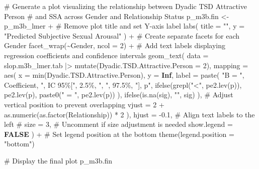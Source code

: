 \documentclass[
  bookmarksnumbered]{article}
\newenvironment{Shaded}{\begin{snugshade}}{\end{snugshade}}
\newcommand{\AttributeTok}[1]{\textcolor[rgb]{0.80,0.80,0.80}{#1}}
\newcommand{\CommentTok}[1]{\textcolor[rgb]{0.50,0.62,0.50}{#1}}
\newcommand{\ConstantTok}[1]{\textcolor[rgb]{0.86,0.64,0.64}{\textbf{#1}}}
\newcommand{\DecValTok}[1]{\textcolor[rgb]{0.86,0.86,0.80}{#1}}
\newcommand{\FloatTok}[1]{\textcolor[rgb]{0.75,0.75,0.82}{#1}}
\newcommand{\FunctionTok}[1]{\textcolor[rgb]{0.94,0.94,0.56}{#1}}
\newcommand{\NormalTok}[1]{\textcolor[rgb]{0.80,0.80,0.80}{#1}}
\newcommand{\OtherTok}[1]{\textcolor[rgb]{0.94,0.94,0.56}{#1}}
\newcommand{\SpecialCharTok}[1]{\textcolor[rgb]{0.86,0.64,0.64}{#1}}
\newcommand{\StringTok}[1]{\textcolor[rgb]{0.80,0.58,0.58}{#1}}
\begin{document}
\begin{Shaded}
\begin{Highlighting}[]
\CommentTok{\# Generate a plot visualizing the relationship between Dyadic TSD Attractive Person}
\CommentTok{\# and SSA across Gender and Relationship Status}
\NormalTok{p\_m3b.fin }\OtherTok{\textless{}{-}}\NormalTok{ p\_m3b\_lmer }\SpecialCharTok{+}
  \CommentTok{\# Remove plot title and set Y{-}axis label}
  \FunctionTok{labs}\NormalTok{(}
    \AttributeTok{title =} \StringTok{""}\NormalTok{,}
    \AttributeTok{y =} \StringTok{"Predicted Subjective Sexual Arousal"}
\NormalTok{  ) }\SpecialCharTok{+}
  \CommentTok{\# Create separate facets for each Gender}
  \FunctionTok{facet\_wrap}\NormalTok{(}\SpecialCharTok{\textasciitilde{}}\NormalTok{Gender, }\AttributeTok{ncol =} \DecValTok{2}\NormalTok{) }\SpecialCharTok{+}
  \CommentTok{\# Add text labels displaying regression coefficients and confidence intervals}
  \FunctionTok{geom\_text}\NormalTok{(}
    \AttributeTok{data =}\NormalTok{ slop.m3b\_lmer.tab }\SpecialCharTok{|\textgreater{}}
      \FunctionTok{mutate}\NormalTok{(}\AttributeTok{Dyadic.TSD.Attractive.Person =} \DecValTok{2}\NormalTok{),}
    \AttributeTok{mapping =} \FunctionTok{aes}\NormalTok{(}
      \AttributeTok{x =} \FunctionTok{min}\NormalTok{(Dyadic.TSD.Attractive.Person), }\AttributeTok{y =} \ConstantTok{Inf}\NormalTok{,}
      \AttributeTok{label =} \FunctionTok{paste}\NormalTok{(}
        \StringTok{"B = "}\NormalTok{, Coefficient,}
        \StringTok{", IC 95\%["}\NormalTok{, }\StringTok{\textasciigrave{}}\AttributeTok{2.5\%}\StringTok{\textasciigrave{}}\NormalTok{, }\StringTok{", "}\NormalTok{, }\StringTok{\textasciigrave{}}\AttributeTok{97.5\%}\StringTok{\textasciigrave{}}\NormalTok{,}
        \StringTok{"], p"}\NormalTok{,}
        \FunctionTok{ifelse}\NormalTok{(}\FunctionTok{grepl}\NormalTok{(}\StringTok{"\textless{}"}\NormalTok{, }\FunctionTok{pe2.lev}\NormalTok{(p)), }\FunctionTok{pe2.lev}\NormalTok{(p),}
          \FunctionTok{paste0}\NormalTok{(}\StringTok{" = "}\NormalTok{, }\FunctionTok{pe2.lev}\NormalTok{(p))}
\NormalTok{        ),}
        \FunctionTok{ifelse}\NormalTok{(}\FunctionTok{is.na}\NormalTok{(sig), }\StringTok{""}\NormalTok{, sig)}
\NormalTok{      ),}
      \CommentTok{\# Adjust vertical position to prevent overlapping}
      \AttributeTok{vjust =} \DecValTok{2} \SpecialCharTok{+} \FunctionTok{as.numeric}\NormalTok{(}\FunctionTok{as.factor}\NormalTok{(Relationship)) }\SpecialCharTok{*} \DecValTok{2}
\NormalTok{    ),}
    \AttributeTok{hjust =} \SpecialCharTok{{-}}\FloatTok{0.1}\NormalTok{, }\CommentTok{\# Align text labels to the left}
    \CommentTok{\# size = 3,  \# Uncomment if size adjustment is needed}
    \AttributeTok{show.legend =} \ConstantTok{FALSE}
\NormalTok{  ) }\SpecialCharTok{+}
  \CommentTok{\# Set legend position at the bottom}
  \FunctionTok{theme}\NormalTok{(}\AttributeTok{legend.position =} \StringTok{"bottom"}\NormalTok{)}

\CommentTok{\# Display the final plot}
\NormalTok{p\_m3b.fin}
\end{Highlighting}
\end{Shaded}
\end{document}

